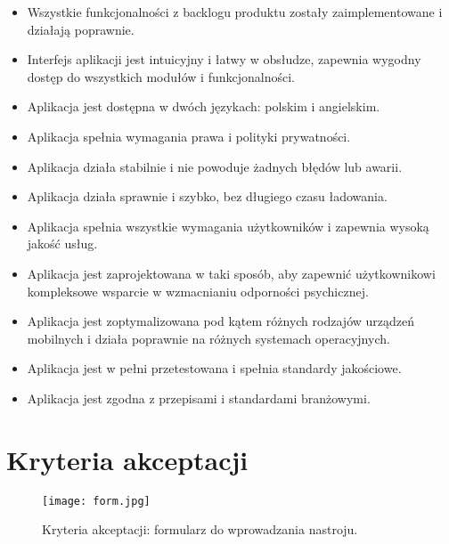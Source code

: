 \documentclass[12pt, letterpaper]{article}
\begin{document}
    \begin{itemize}
        \item Wszystkie funkcjonalności z backlogu produktu zostały
        zaimplementowane i działają poprawnie. 

        \item Interfejs aplikacji jest intuicyjny i łatwy w obsłudze, zapewnia
        wygodny dostęp do wszystkich modułów i funkcjonalności. 

        \item Aplikacja jest dostępna w dwóch językach: polskim i angielskim. 

        \item Aplikacja spełnia wymagania prawa i polityki prywatności. 
        
        \item Aplikacja działa stabilnie i nie powoduje żadnych błędów lub
        awarii. 
        
        \item Aplikacja działa sprawnie i szybko, bez długiego czasu ładowania. 
        
        \item Aplikacja spełnia wszystkie wymagania użytkowników i zapewnia
        wysoką jakość usług. 
        
        \item Aplikacja jest zaprojektowana w taki sposób, aby zapewnić
        użytkownikowi kompleksowe wsparcie w wzmacnianiu odporności psychicznej. 
        
        \item Aplikacja jest zoptymalizowana pod kątem różnych rodzajów urządzeń
        mobilnych i działa poprawnie na różnych systemach operacyjnych. 
        
        \item Aplikacja jest w pełni przetestowana i spełnia standardy
        jakościowe. 
        
        \item Aplikacja jest zgodna z przepisami i standardami branżowymi. 
      \end{itemize}

    \pagebreak

    \section{Kryteria akceptacji}

    \begin{figure}[h]
        \centering
        \texttt{[image: form.jpg]}
        \caption{Kryteria akceptacji: formularz do wprowadzania nastroju.}
    \end{figure}
\end{document}

